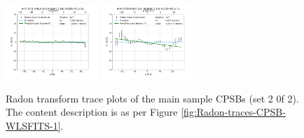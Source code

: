 \begin{figure}
    \includegraphics[width=0.31\textwidth]{Images/WLSFITS/CPSB/9494-3701.png}
    \includegraphics[width=0.31\textwidth]{Images/WLSFITS/CPSB/9494-3703.png}
%
    \caption{Radon transform trace plots of the main sample CPSBs (set 2 0f 2). The content description is as per Figure \ref{fig:Radon-traces-CPSB-WLSFITS-1}.}
    \label{fig:Radon-traces-CPSB-WLSFITS-2}
\end{figure}


